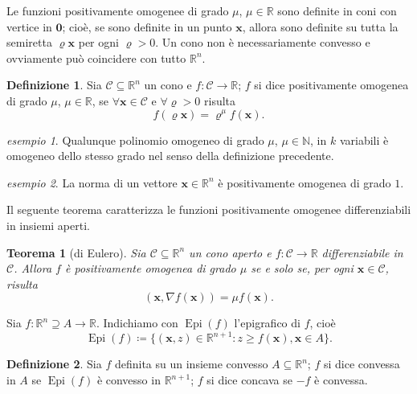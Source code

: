 \documentclass[a4paper]{book}
\DeclareMathOperator{\Epi}{Epi}
\numberwithin{equation}{section}
\renewcommand{\rho}{\varrho}
\theoremstyle{plain}
\newtheorem{teor}{Teorema}[section]
\theoremstyle{definition}
\newtheorem{defn}{Definizione}[section]
\theoremstyle{remark}
\renewcommand{\vec}{\boldsymbol}
\theoremstyle{example}
\newtheorem{exmp}{esempio}[section]
\begin{document}
Le funzioni positivamente omogenee di grado $\mu$, $\mu \in \mathbb{R}$ sono definite in coni con vertice in $\vec{0}$; cioè, se sono definite in un punto $\vec{x}$, allora sono definite su tutta la semiretta $\rho \vec{x}$ per ogni $\rho > 0$. Un cono non è necessariamente convesso e ovviamente può coincidere con tutto $\mathbb{R}^n$.
\begin{defn}
	Sia $\mathcal{C} \subseteq \mathbb{R}^n$ un cono e $f \colon \mathcal{C} \to \mathbb{R}$; $f$ si dice positivamente omogenea di grado $\mu$, $\mu \in \mathbb{R}$, se $\forall \vec{x} \in \mathcal{C}$ e $\forall \rho > 0$ risulta
	\begin{equation}
		f(\rho \vec{x}) = \rho^{\mu}f(\vec{x}).
	\end{equation}
\end{defn}

\begin{exmp}
	Qualunque polinomio omogeneo di grado $\mu$, $\mu \in \mathbb{N}$, in $k$ variabili è omogeneo dello stesso grado nel senso della definizione precedente.
\end{exmp}

\begin{exmp}
	La norma di un vettore $\vec{x} \in \mathbb{R}^n$ è positivamente omogenea di grado $1$.
\end{exmp}

Il seguente teorema caratterizza le funzioni positivamente omogenee differenziabili in insiemi aperti.

\begin{teor}[di Eulero]
	Sia $\mathcal{C} \subseteq \mathbb{R}^n$ un cono aperto e $f \colon \mathcal{C} \to \mathbb{R}$ differenziabile in $\mathcal{C}$. Allora $f$ è positivamente omogenea di grado $\mu$ se e solo se, per ogni $\vec{x} \in \mathcal{C}$, risulta
	\begin{equation}
		(\vec{x}, \nabla f(\vec{x})) = \mu f(\vec{x}).
	\end{equation}
\end{teor}

Sia $f \colon \mathbb{R}^n \supseteq A \to \mathbb{R}$. Indichiamo con $\Epi(f)$ l'epigrafico di $f$, cioè
\begin{equation*}
	\Epi(f) \coloneqq \{ (\vec{x}, z) \in \mathbb{R}^{n+1} \colon z \ge f(\vec{x}), \vec{x} \in A \}.
\end{equation*}

\begin{defn}
	Sia $f$ definita su un insieme convesso $A \subseteq \mathbb{R}^n$; $f$ si dice convessa in $A$ se $\Epi(f)$ è convesso in $\mathbb{R}^{n+1}$; $f$ si dice concava se $-f$ è convessa.
\end{defn}
\end{document}
